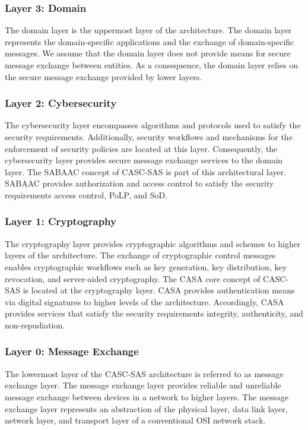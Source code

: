 \subsubsection{Layer 3: Domain}
The domain layer is the uppermost layer of the architecture.
The domain layer represents the domain-specific applications and the exchange of domain-specific messages.
We assume that the domain layer does not provide means for secure message exchange between entities.
As a consequence, the domain layer relies on the secure message exchange provided by lower layers.

\subsubsection{Layer 2: Cybersecurity}
The cybersecurity layer encompasses algorithms and protocols used to satisfy the security requirements.
Additionally, security workflows and mechanisms for the enforcement of security policies are located at this layer.
Consequently, the cybersecurity layer provides secure message exchange services to the domain layer.
The SABAAC concept of CASC-SAS is part of this architectural layer.
SABAAC provides authorization and access control to satisfy the security requirements access control, PoLP, and SoD.

\subsubsection{Layer 1: Cryptography}
The cryptography layer provides cryptographic algorithms and schemes to higher layers of the architecture.
The exchange of cryptographic control messages enables cryptographic workflows such as key generation, key distribution, key revocation, and server-aided cryptography.
The CASA core concept of CASC-SAS is located at the cryptography layer.
CASA provides authentication means via digital signatures to higher levels of the architecture.
Accordingly, CASA provides services that satisfy the security requirements integrity, authenticity, and non-repudiation.

\subsubsection{Layer 0: Message Exchange}
The lowermost layer of the CASC-SAS architecture is referred to as message exchange layer.
The message exchange layer provides reliable and unreliable message exchange between devices in a network to higher layers.
The message exchange layer represents an abstraction of the physical layer, data link layer, network layer, and transport layer of a conventional OSI network stack.

